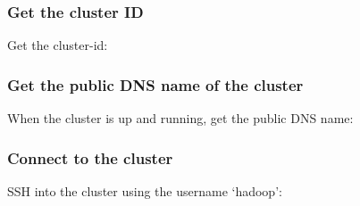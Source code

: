 \subsubsection{Get the cluster ID}\label{get-the-cluster-id}

Get the cluster-id:

\begin{Shaded}
\begin{Highlighting}[]
\NormalTok{$ } 
    \NormalTok{: }\NormalTok{,}
    \NormalTok{: }
\end{Highlighting}
\end{Shaded}

\subsubsection{Get the public DNS name of the
cluster}\label{get-the-public-dns-name-of-the-cluster}

When the cluster is up and running, get the public DNS name:

\begin{Shaded}
\begin{Highlighting}[]
\NormalTok{$ } 
    \KeywordTok{|}  
    \NormalTok{: }
\end{Highlighting}
\end{Shaded}

\subsubsection{Connect to the cluster}\label{connect-to-the-cluster}

SSH into the cluster using the username `hadoop':

\begin{Shaded}
\begin{Highlighting}[]
\NormalTok{$ } \KeywordTok{<}\KeywordTok{>} \KeywordTok{<}\KeywordTok{>}
\end{Highlighting}
\end{Shaded}

